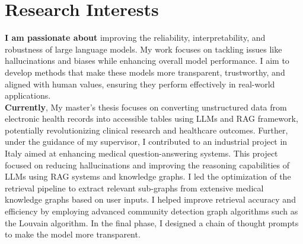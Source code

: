 \documentclass[letterpaper,11pt]{article}
\newcommand{\resumeSubHeadingListStart}{\begin{itemize}[leftmargin=0.0in, label={}]}
\newcommand{\resumeSubHeadingListEnd}{\end{itemize}}
\begin{document}
	\section{\textcolor{title-color}{Research Interests}}
	\textbf{I am passionate about} improving the reliability, interpretability, and robustness of large language models. My work focuses on tackling issues like hallucinations and biases while enhancing overall model performance. I aim to develop methods that make these models more transparent, trustworthy, and aligned with human values, ensuring they perform effectively in real-world applications.
	\\\textbf{Currently}, My master’s thesis focuses on converting unstructured data from electronic health records into accessible tables using LLMs and RAG framework, potentially revolutionizing clinical research and healthcare outcomes. 	Further, under the guidance of my supervisor, I contributed to an industrial project in Italy aimed at enhancing medical question-answering systems. This project focused on reducing hallucinations and improving the reasoning capabilities of LLMs using RAG systems and knowledge graphs. I led the optimization of the retrieval pipeline to extract relevant sub-graphs from extensive medical knowledge graphs based on user inputs. I helped improve retrieval accuracy and efficiency by employing advanced community detection graph algorithms such as the Louvain algorithm. In the final phase, I designed a chain of thought prompts to make the model more transparent.
	
	
	
\end{document}
